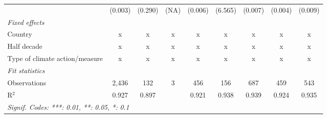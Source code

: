 \begin{table}[htbp]
\begin{tabular}{lcccccccc}
                                                                         & (0.003)       & (0.290)                   & (NA)         & (0.006)        & (6.565)          & (0.007)         & (0.004)         & (0.009)\\   
      \emph{Fixed effects}\\
      Country                                                            & x             & x                         & x            & x              & x                & x               & x               & x\\  
      Half decade                                                        & x             & x                         & x            & x              & x                & x               & x               & x\\  
      Type of climate action/measure                                     & x             & x                         & x            & x              & x                & x               & x               & x\\  
      \midrule \emph{Fit statistics}\\
      Observations                                                       & 2,436         & 132                       & 3            & 456            & 156              & 687             & 459             & 543\\  
      R$^2$                                                              & 0.927         & 0.897                     &              & 0.921          & 0.938            & 0.939           & 0.924           & 0.935\\  
      \midrule
      \multicolumn{9}{l}{\emph{Signif. Codes: ***: 0.01, **: 0.05, *: 0.1}}\\
   \end{tabular}
\end{table}


